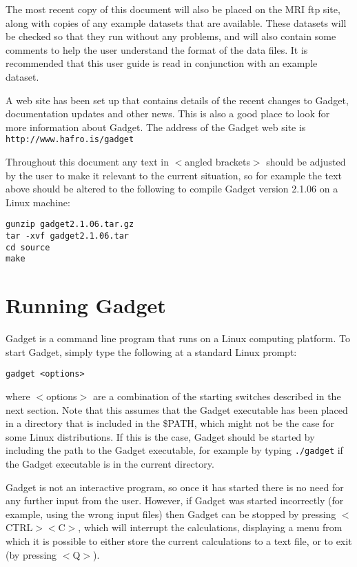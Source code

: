 \documentclass[10pt,twoside]{book}
\begin{document}
The most recent copy of this document will also be placed on the MRI ftp site, along with copies of any example datasets that are available.  These datasets will be checked so that they run without any problems, and will also contain some comments to help the user understand the format of the data files.  It is recommended that this user guide is read in conjunction with an example dataset.

\bigskip
A web site has been set up that contains details of the recent changes to Gadget, documentation updates and other news.  This is also a good place to look for more information about Gadget.  The address of the Gadget web site is {\tt http://www.hafro.is/gadget}

\bigskip
Throughout this document any text in $<$angled brackets$>$ should be adjusted by the user to make it relevant to the current situation, so for example the text above should be altered to the following to compile Gadget version 2.1.06 on a Linux machine:

{\small\begin{verbatim}
gunzip gadget2.1.06.tar.gz
tar -xvf gadget2.1.06.tar
cd source
make
\end{verbatim}}

\section{Running Gadget}\label{sec:runninggadget}
Gadget is a command line program that runs on a Linux computing platform.  To start Gadget, simply type the following at a standard Linux prompt:

{\small\begin{verbatim}
gadget <options>
\end{verbatim}}

where $<$options$>$ are a combination of the starting switches described in the next section.  Note that this assumes that the Gadget executable has been placed in a directory that is included in the \$PATH, which might not be the case for some Linux distributions.  If this is the case, Gadget should be started by including the path to the Gadget executable, for example by typing {\small{\tt ./gadget}} if the Gadget executable is in the current directory.

\bigskip
Gadget is not an interactive program, so once it has started there is no need for any further input from the user.  However, if Gadget was started incorrectly (for example, using the wrong input files) then Gadget can be stopped by pressing $<$CTRL$><$C$>$, which will interrupt the calculations, displaying a menu from which it is possible to either store the current calculations to a text file, or to exit (by pressing $<$Q$>$).
\end{document}
